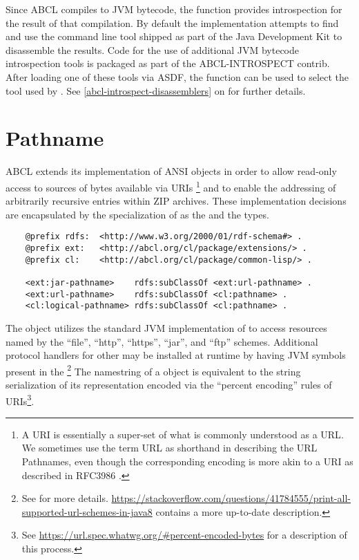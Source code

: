\documentclass[10pt]{book}
\begin{document}
\label{CL:DISASSEMBLE}
Since \textsc{ABCL} compiles to JVM bytecode, the
 function provides introspection for the result
of that compilation.  By default the implementation attempts to find
and use the  command line tool shipped as part of the Java
Development Kit to disassemble the results.  Code for the use of
additional JVM bytecode introspection tools is packaged as part of the
ABCL-INTROSPECT contrib.  After loading one of these tools via ASDF,
the  function can be used to select the
tool used by .  See
\ref{abcl-introspect-disassemblers}
on \pageref{abcl-introspect-disassemblers} for further details.

\section{Pathname}

\textsc{ABCL} extends its implementation of \textsc{ANSI}
 objects in order to allow read-only access to sources
of bytes available via URIs \footnote{A \textsc{URI} is essentially a
super-set of what is commonly understood as a \textsc{URL}. We
sometimes use the term URL as shorthand in describing the URL
Pathnames, even though the corresponding encoding is more akin to a
URI as described in RFC3986 \cite{rfc3986}.} and to enable the
addressing of arbitrarily recursive entries within \textsc{ZIP}
archives.  These implementation decisions are encapsulated by the
specialization of  as the 
and the  types.

\begin{verbatim}
    @prefix rdfs:  <http://www.w3.org/2000/01/rdf-schema#> .
    @prefix ext:   <http://abcl.org/cl/package/extensions/> .
    @prefix cl:    <http://abcl.org/cl/package/common-lisp/> .
   
    <ext:jar-pathname>    rdfs:subClassOf <ext:url-pathname> .
    <ext:url-pathname>    rdfs:subClassOf <cl:pathname> .
    <cl:logical-pathname> rdfs:subClassOf <cl:pathname> .
\end{verbatim}

The  object utilizes the standard \textsc{JVM}
implementation of  to access resources named by the
``file'', ``http'', ``https'', ``jar'', and ``ftp'' schemes.
Additional protocol handlers for other may be installed at runtime by
having \textsc{JVM} symbols present in the
\footnote{See \cite{maso2000} for more
details. \url{https://stackoverflow.com/questions/41784555/print-all-supported-url-schemes-in-java8}
contains a more up-to-date description.}  The namestring of a
 object is equivalent to the string
serialization of its representation encoded via the ``percent
encoding'' rules of URIs\footnote{See
\url{https://url.spec.whatwg.org/\#percent-encoded-bytes} for a
description of this process.}.
\end{document}
